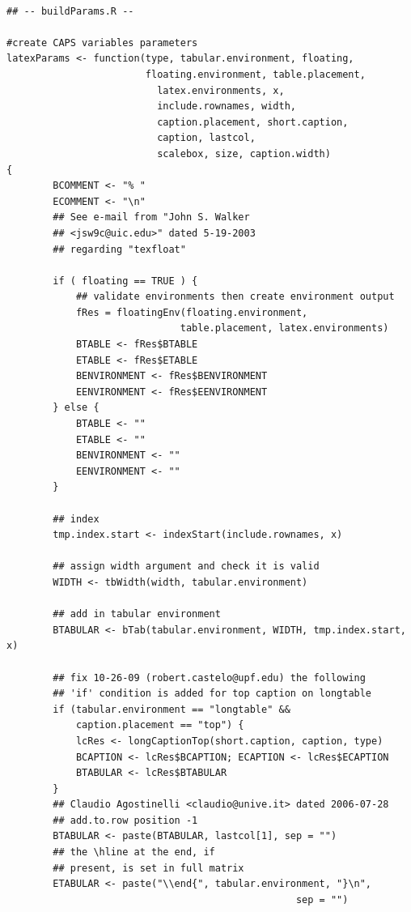 \documentclass{memoir}\usepackage[]{graphicx}\usepackage[]{color}
\begin{document}
\newpage

\begin{lstlisting}

## -- buildParams.R --

#create CAPS variables parameters
latexParams <- function(type, tabular.environment, floating, 
                        floating.environment, table.placement, 
                          latex.environments, x, 
                          include.rownames, width, 
                          caption.placement, short.caption, 
                          caption, lastcol, 
                          scalebox, size, caption.width)
{
        BCOMMENT <- "% "
        ECOMMENT <- "\n"
        ## See e-mail from "John S. Walker 
        ## <jsw9c@uic.edu>" dated 5-19-2003
        ## regarding "texfloat"

        if ( floating == TRUE ) {
            ## validate environments then create environment output
            fRes = floatingEnv(floating.environment, 
                              table.placement, latex.environments)
            BTABLE <- fRes$BTABLE
            ETABLE <- fRes$ETABLE
            BENVIRONMENT <- fRes$BENVIRONMENT
            EENVIRONMENT <- fRes$EENVIRONMENT
        } else {
            BTABLE <- ""
            ETABLE <- ""
            BENVIRONMENT <- ""
            EENVIRONMENT <- ""
        }

        ## index
        tmp.index.start <- indexStart(include.rownames, x)

        ## assign width argument and check it is valid
        WIDTH <- tbWidth(width, tabular.environment)

        ## add in tabular environment
        BTABULAR <- bTab(tabular.environment, WIDTH, tmp.index.start, x)

        ## fix 10-26-09 (robert.castelo@upf.edu) the following
        ## 'if' condition is added for top caption on longtable
        if (tabular.environment == "longtable" && 
            caption.placement == "top") {
            lcRes <- longCaptionTop(short.caption, caption, type)
            BCAPTION <- lcRes$BCAPTION; ECAPTION <- lcRes$ECAPTION   
            BTABULAR <- lcRes$BTABULAR
        }
        ## Claudio Agostinelli <claudio@unive.it> dated 2006-07-28
        ## add.to.row position -1
        BTABULAR <- paste(BTABULAR, lastcol[1], sep = "")
        ## the \hline at the end, if 
        ## present, is set in full matrix
        ETABULAR <- paste("\\end{", tabular.environment, "}\n", 
                                                  sep = "")


\end{lstlisting}
\end{document}
